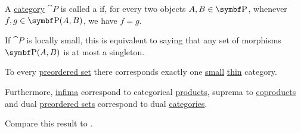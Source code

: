 \begin{definition}\label{def:thin_category}
  A \hyperref[def:category]{category} \( \cat{P} \) is called a  if, for every two objects \( A, B \in \bop{P} \), whenever \( f, g \in \bop{P}(A, B) \), we have \( f = g \).

  If \( \cat{P} \) is locally small, this is equivalent to saying that any set of morphisms \( \bop{P}(A, B) \) is at most a singleton.
\end{definition}

\begin{proposition}\label{thm:preorder_category_correspondence}
  To every \hyperref[def:preordered_set]{preordered set} there corresponds exactly one \hyperref[def:category_cardinality]{small} \hyperref[def:thin_category]{thin} category.

  Furthermore, \hyperref[def:preordered_set/supremum_infimum]{infima} correspond to categorical \hyperref[def:categorical_product]{products}, suprema to \hyperref[def:categorical_coproduct]{coproducts} and dual \hyperref[def:preordered_set/dual]{preordered sets} correspond to dual \hyperref[def:opposite_category]{categories}.

  Compare this result to .
\end{proposition}

